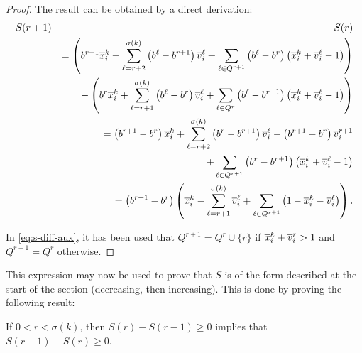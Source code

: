 \begin{proof}
    The result can be obtained by a direct derivation:
    \begin{eqnarray*}
        &S(r + 1)
             &-  S(r)\\
        &    &=  \left(
                    b^{r+1}\overline{x}_i^k
                    + \sum_{\ell = r + 2}^{\sigma(k)}
                        \left(b^\ell - b^{r + 1}\right)\overline{v}_i^\ell
                    + \sum_{\ell \in Q^{r + 1}}
                        \left(b^\ell - b^r\right) \left(\overline{x}_i^k + \overline{v}_i^\ell - 1\right)
                \right)\\
        &    &\quad -\left(
                    b^r\overline{x}_i^k
                    + \sum_{\ell = r + 1}^{\sigma(k)}
                        \left(b^\ell - b^r\right)\overline{v}_i^\ell
                    + \sum_{\ell \in Q^r}
                        \left(b^\ell - b^{r + 1}\right) \left(\overline{x}_i^k + \overline{v}_i^\ell - 1\right)
                \right)\\
        &    &=  \left(b^{r+1}-b^r\right)\overline{x}_i^k
                + \sum_{\ell = r + 2}^{\sigma(k)}
                    \left(b^r - b^{r + 1}\right)\overline{v}_i^\ell
                - \left(b^{r + 1} - b^r\right)\overline{v}_i^{r + 1}\\
        &    &\quad +\sum_{\ell \in Q^{r + 1}}
                    \left(b^r - b^{r + 1}\right)\left(\overline{x}_i^k + \overline{v}_i^\ell - 1\right)\label{eq:s-diff-aux}\\
        &    &=  \left(b^{r + 1} - b^r\right)
                \left(
                    \overline{x}_i^k
                    - \sum_{\ell = r + 1}^{\sigma(k)} \overline{v}_i^\ell
                    + \sum_{\ell \in Q^{r + 1}} \left(1 - \overline{x}_i^k - \overline{v}_i^\ell\right)
                \right).
    \end{eqnarray*}

    In \eqref{eq:s-diff-aux}, it has been used that $Q^{r + 1} = Q^r \cup \{ r
    \}$ if $\overline{x}_i^k + \overline{v}_i^r > 1$ and $Q^{r + 1} = Q^r$ otherwise.
\end{proof}

This expression may now be used to prove that $S$ is of the form described at
the start of the section (decreasing, then increasing). This is done by proving
the following result:

\begin{proposition}
    If $0 < r < \sigma(k)$, then $S(r) - S(r - 1) \geq 0$ implies that $S(r + 1)
    - S(r) \geq 0$.
\end{proposition}


